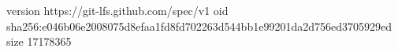 version https://git-lfs.github.com/spec/v1
oid sha256:e046b06e2008075d8efaa1fd8fd702263d544bb1e99201da2d756ed3705929ed
size 17178365
